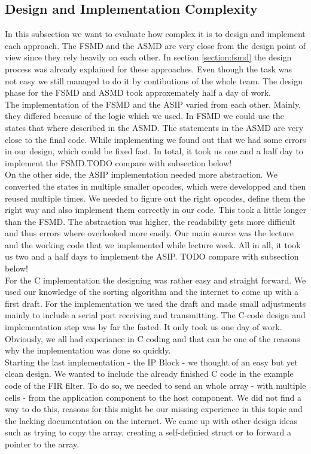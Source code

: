 \documentclass[conference]{IEEEtran}
\begin{document}
\subsection{Design and Implementation Complexity}
In this subsection we want to evaluate how complex it is to design and implement each approach. The FSMD and the ASMD are very close from the design point of view since they rely heavily on each other. In section \autoref{section:fsmd} the design process was already explained for these approaches. Even though the task was not easy we still managed to do it by contibutions of the whole team. The design phase for the FSMD and ASMD took approxemately half a day of work.\\
The implementation of the FSMD and the ASIP varied from each other. Mainly, they differed because of the logic which we used. In FSMD we could use the states that where described in the ASMD. The statements in the ASMD are very close to the final code. While implementing we found out that we had some errors in our design, which could be fixed fast. In total, it took us one and a half day to implement the FSMD.TODO compare with subsection below!\\ 
On the other side, the ASIP implementation needed more abstraction. We converted the states in multiple smaller opcodes, which were developped and then reused multiple times. We needed to figure out the right opcodes, define them the right way and also implement them correctly in our code. This took a little longer than the FSMD. The abstraction was higher, the readability gets more difficult and thus errors where overlooked more easily. Our main source was the lecture and the working code that we implemented while lecture week. All in all, it took us two and a half days to implement the ASIP. TODO compare with subsection below!\\
For the C implementation the designing was rather easy and straight forward. We used our knowledge of the sorting algorithm and the internet to come up with a first draft. For the implementation we used the draft and made small adjustments mainly to include a serial port receiving and transmitting. The C-code design and implementation step was by far the fasted. It only took us one day of work. Obviously, we all had experiance in C coding and that can be one of the reasons why the implementation was done so quickly. \\
Starting the last implementation - the IP Block - we thought of an easy but yet clean design. We wanted to include the already finished C code in the example code of the FIR filter. To do so, we needed to send an whole array - with multiple cells - from the application component to the host component. We did not find a way to do this, reasons for this might be our missing experience in this topic and the lacking documentation on the internet. We came up with other design ideas such as trying to copy the array, creating a self-definied struct or to forward a pointer to the array.\\ 
\end{document}
